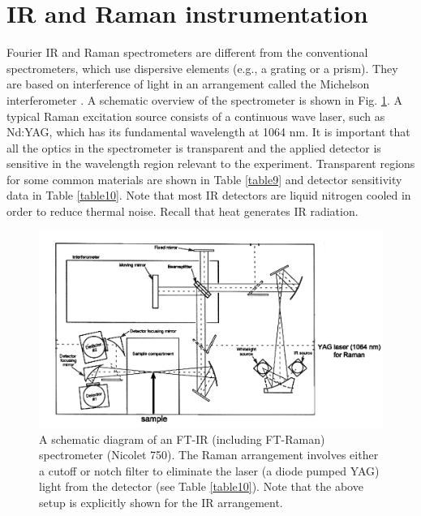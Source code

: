 \documentclass[byrevtex,amssymb,aps,pra,floatfix,letterpaper]{revtex4}
\begin{document}
\section{IR and Raman instrumentation}

Fourier IR and Raman spectrometers are different from the conventional spectrometers, which use dispersive elements (e.g., a grating or a prism). They are based on interference of light in an arrangement called the Michelson interferometer \cite{ATKINS1}. A schematic overview of the spectrometer is shown in Fig. \ref{fig4}. A typical Raman excitation source consists of a continuous wave laser, such as Nd:YAG, which has its fundamental wavelength at 1064 nm. It is important that all the optics in the spectrometer is transparent and the applied detector is sensitive in the wavelength region relevant to the experiment. Transparent regions for some common materials are shown in Table \ref{table9} and detector sensitivity data in Table \ref{table10}. Note that most IR detectors are liquid nitrogen cooled in order to reduce thermal noise. Recall that heat generates IR radiation.

\begin{figure}[!htp]
\begin{center}
\includegraphics[scale=0.8]{fig4}
\vspace{-1cm}
\caption{A schematic diagram of an FT-IR (including FT-Raman) spectrometer (Nicolet 750). The Raman arrangement involves either a cutoff or notch filter to eliminate the laser (a diode pumped YAG) light from the detector (see Table \ref{table10}). Note that the above setup is explicitly shown for the IR arrangement.}
\label{fig4}
\end{center}
\end{figure}
\end{document}
